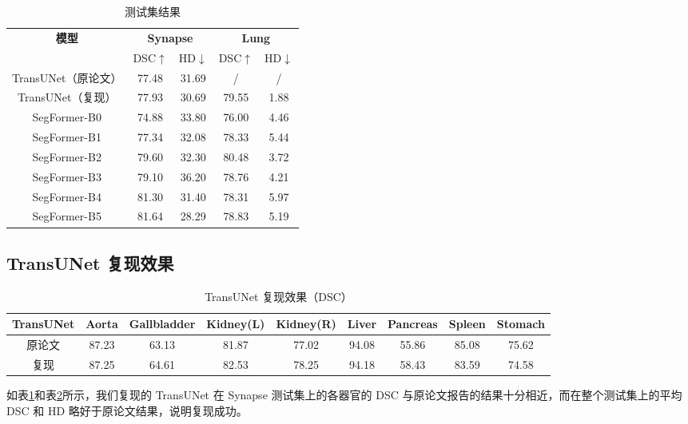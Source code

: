 \documentclass[hyperref,a4paper,UTF8]{ctexart}
\begin{document}
\begin{table}[ht!]
    \centering
    \caption{测试集结果}
    \label{tab:测试集结果}
    \begin{tabular}{c|c|c|c|c}
        \multirow{2}{*}{\textbf{模型}} & \multicolumn{2}{c|}{\textbf{Synapse}} & \multicolumn{2}{c}{\textbf{Lung}}\\
            & DSC$\uparrow$ & HD$\downarrow$ & DSC$\uparrow$ & HD$\downarrow$\\
        \hline
        TransUNet（原论文） & 77.48 & 31.69 & / & / \\
        TransUNet（复现） & 77.93 & 30.69 & 79.55 & 1.88 \\
        \hline
        SegFormer-B0 & 74.88 & 33.80 & 76.00 & 4.46 \\
        SegFormer-B1 & 77.34 & 32.08 & 78.33 & 5.44 \\
        SegFormer-B2 & 79.60 & 32.30 & 80.48 & 3.72 \\
        SegFormer-B3 & 79.10 & 36.20 & 78.76 & 4.21 \\
        SegFormer-B4 & 81.30 & 31.40 & 78.31 & 5.97 \\
        SegFormer-B5 & 81.64 & 28.29 & 78.83 & 5.19
    \end{tabular}
\end{table}

\subsection{TransUNet 复现效果}

\begin{table}[ht!]
    \centering
    \caption{TransUNet 复现效果（DSC）}
    \label{tab:TransUNet复现效果}
    \begin{tabular}{c|c|c|c|c|c|c|c|c}
        \textbf\small{TransUNet} & \textbf\small{Aorta} & \textbf\small{Gallbladder} & \textbf\small{Kidney(L)} & \textbf\small{Kidney(R)} & \textbf\small{Liver} & \textbf\small{Pancreas} & \textbf\small{Spleen} & \textbf\small{Stomach}\\
        \hline
        原论文 & 87.23 & 63.13 & 81.87 & 77.02 & 94.08 & 55.86 & 85.08 & 75.62 \\
        复现 & 87.25 & 64.61 & 82.53 & 78.25 & 94.18 & 58.43 & 83.59 & 74.58
    \end{tabular}
\end{table}

如表\ref{tab:测试集结果}和表\ref{tab:TransUNet复现效果}所示，我们复现的 TransUNet 在 Synapse 测试集上的各器官的 DSC 与原论文报告的结果十分相近，而在整个测试集上的平均 DSC 和 HD 略好于原论文结果，说明复现成功。
\end{document}

